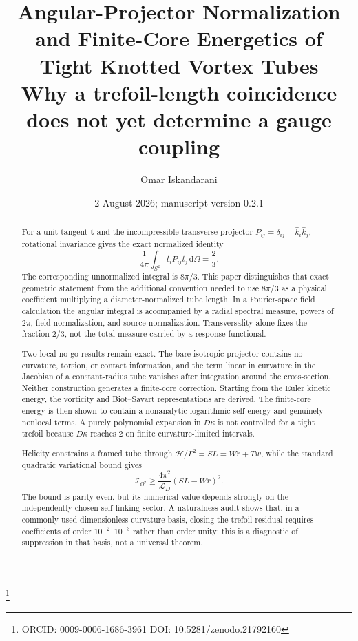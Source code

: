 \documentclass[aps,pre,preprint,notitlepage,nofootinbib,superscriptaddress]{revtex4-2}
\newcommand{\dd}{\mathrm d}
\begin{document}
\title{\texorpdfstring{Angular-Projector Normalization and Finite-Core Energetics of Tight Knotted Vortex Tubes\\\large Why a trefoil-length coincidence does not yet determine a gauge coupling}{Angular-Projector Normalization and Finite-Core Energetics of Tight Knotted Vortex Tubes: Why a trefoil-length coincidence does not yet determine a gauge coupling}}

\author{Omar Iskandarani}
\thanks{ORCID: 0009-0006-1686-3961  DOI: 10.5281/zenodo.21792160}
\date{2 August 2026; manuscript version 0.2.1}

\begin{abstract}
For a unit tangent $\bm t$ and the incompressible transverse projector $P_{ij}=\delta_{ij}-\widehat{k}_i\widehat{k}_j$, rotational invariance gives the exact normalized identity
\[
\frac{1}{4\pi}\int_{S^2}t_iP_{ij}t_j\,\dd\Omega=\frac23.
\]
The corresponding unnormalized integral is $8\pi/3$.  This paper distinguishes that exact geometric statement from the additional convention needed to use $8\pi/3$ as a physical coefficient multiplying a diameter-normalized tube length.  In a Fourier-space field calculation the angular integral is accompanied by a radial spectral measure, powers of $2\pi$, field normalization, and source normalization.  Transversality alone fixes the fraction $2/3$, not the total measure carried by a response functional.

Two local no-go results remain exact.  The bare isotropic projector contains no curvature, torsion, or contact information, and the term linear in curvature in the Jacobian of a constant-radius tube vanishes after integration around the cross-section.  Neither construction generates a finite-core correction.  Starting from the Euler kinetic energy, the vorticity and Biot--Savart representations are derived.  The finite-core energy is then shown to contain a nonanalytic logarithmic self-energy and genuinely nonlocal terms.  A purely polynomial expansion in $D\kappa$ is not controlled for a tight trefoil because $D\kappa$ reaches $2$ on finite curvature-limited intervals.

Helicity constrains a framed tube through $\mathcal H/\Gamma^2=SL=Wr+Tw$, while the standard quadratic variational bound gives
\[
\mathcal I_{\Omega^2}\geq \frac{4\pi^2}{\mathcal L_D}(SL-Wr)^2.
\]
The bound is parity even, but its numerical value depends strongly on the independently chosen self-linking sector.  A naturalness audit shows that, in a commonly used dimensionless curvature basis, closing the trefoil residual requires coefficients of order $10^{-2}$--$10^{-3}$ rather than order unity; this is a diagnostic of suppression in that basis, not a universal theorem.


\end{abstract}
\end{document}

